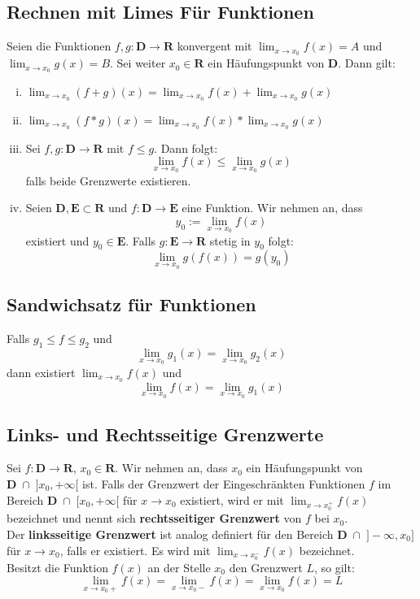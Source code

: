 \documentclass[8pt]{article}
\begin{document}
\begin{multicols*}{3}
\subsection{Rechnen mit Limes Für Funktionen}
Seien die Funktionen $f, g: \mathbf{D} \rightarrow \mathbf{R}$ konvergent mit
$\lim_{x \rightarrow x_0} f(x) = A$ und $\lim_{x \rightarrow x_0} g(x) = B$. Sei weiter
$x_0 \in \mathbf{R}$ ein Häufungspunkt von $\mathbf{D}$.
Dann gilt:
\begin{enumerate}[(i)]
  \item $\lim_{x \rightarrow x_0} (f + g)(x) = \lim_{x \rightarrow x_0} f(x) + \lim_{x \rightarrow x_0} g(x)$
  \item $\lim_{x \rightarrow x_0} (f * g)(x) = \lim_{x \rightarrow x_0} f(x) * \lim_{x \rightarrow x_0} g(x)$
  \item Sei $f, g: \mathbf{D} \rightarrow \mathbf{R} \text{ mit } f \leq g$. Dann folgt:
  $$
    \lim_{x \rightarrow x_0} f(x) \leq \lim_{x \rightarrow x_0} g(x)
  $$
  falls beide Grenzwerte existieren.
  \item Seien $\mathbf{D}, \mathbf{E} \subset \mathbf{R}$ und $f: \mathbf{D} \rightarrow \mathbf{E}$ eine Funktion. Wir nehmen an, dass $$y_0 := \lim_{x \rightarrow x_0} f(x)$$ existiert
  und $y_0 \in \mathbf{E}$. Falls $g:\mathbf{E} \rightarrow \mathbf{R}$ stetig in $y_0$ folgt:
  $$\lim_{x \rightarrow x_0} g(f(x)) = g(y_0)$$
\end{enumerate}
  \subsection{Sandwichsatz für Funktionen}
Falls $g_1 \leq f \leq g_2$ und
  $$
  \lim_{x \rightarrow x_0} g_1(x) = \lim_{x \rightarrow x_0} g_2(x)
  $$
  dann existiert $\lim_{x \rightarrow x_0} f(x)$ und
  $$
  \lim_{x \rightarrow x_0} f(x) = \lim_{x \rightarrow x_0} g_1(x)
  $$
 \subsection{Links- und Rechtsseitige Grenzwerte}
Sei $f: \mathbf{D} \rightarrow \mathbf{R}$, $x_0 \in \mathbf{R}$. Wir nehmen an, dass
$x_0$ ein Häufungspunkt von $\mathbf{D} \;\cap\; ]x_0, +\infty[$ ist. Falls der Grenzwert
der Eingeschränkten Funktionen $f$ im Bereich $\mathbf{D} \;\cap\; [x_0, +\infty[$ für
$x \rightarrow x_0$ existiert, wird er mit $\lim_{x \rightarrow x_0^+} f(x)$ bezeichnet und
nennt sich \textbf{rechtsseitiger Grenzwert} von $f$ bei $x_0$.\\
Der \textbf{linksseitige Grenzwert} ist analog definiert für den Bereich $\mathbf{D} \;\cap\; ]-\infty, x_0]$
für $x \rightarrow x_0$, falls er existiert. Es wird mit $\lim_{x \rightarrow x_0^-} f(x)$ bezeichnet.\\
Besitzt die Funktion $f(x)$ an der Stelle $x_0$ den Grenzwert $L$, so gilt:
$$
  \lim_{x \rightarrow x_0+} f(x) = \lim_{x \rightarrow x_0-} f(x) = \lim_{x \rightarrow x_0} f(x) = L
$$

\end{multicols*}
\end{document}
